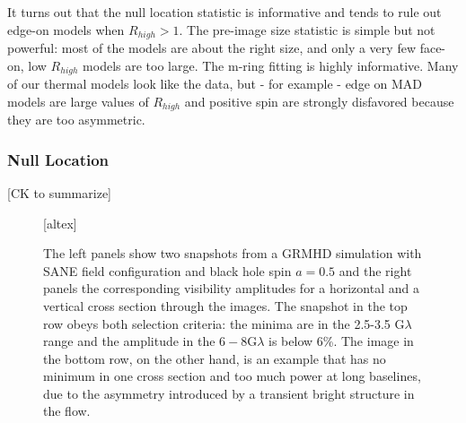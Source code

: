 It turns out that the null location statistic is informative and tends to rule out edge-on models when $R_{high} > 1$.  The pre-image size statistic is simple but not powerful: most of the models are about the right size, and only a very few face-on, low $R_{high}$ models are too large.   The m-ring fitting is highly informative.  Many of our thermal models look like the data, but - for example - edge on MAD models are large values of $R_{high}$ and positive spin are strongly disfavored because they are too asymmetric.

\subsubsection{Null Location}

[CK to summarize]


\begin{figure*}[]
  [altex]
  \caption{The left panels show two snapshots from a GRMHD simulation
    with SANE field configuration and black hole spin $a=0.5$ and the
    right panels the corresponding visibility amplitudes for a
    horizontal and a vertical cross section through the images.
    The snapshot in the top row obeys both selection criteria: the
    minima are in the 2.5-3.5 G$\lambda$ range and the amplitude in
    the $6-8$G$\lambda$ is below 6\%.
    The image in the bottom row, on the other hand, is an example that
    has no minimum in one cross section and too much power at long
    baselines, due to the asymmetry introduced by a transient bright
    structure in the flow.}
  \label{fig:VA}
\end{figure*}

